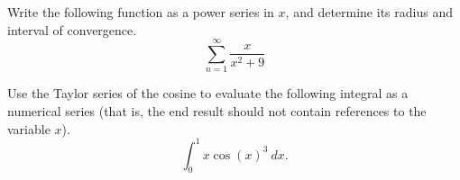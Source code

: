 \documentclass[11pt]{exam}
\begin{document}
\begin{questions}


\newpage
\addpoints
\question[3] Write the following function as a power series in $x$, and determine its radius and interval of convergence. 
\begin{equation*}
\sum_{n=1}^{\infty} \frac{x}{x^2+9}
\end{equation*}

\newpage
\addpoints
\question[3] Use the Taylor series of the cosine to evaluate the following integral as a numerical series (that is, the end result should not contain references to the variable $x$). 
\begin{equation*}
\int_{0}^{1}x\cos(x)^3\ dx.
\end{equation*}

\end{questions}
\end{document}
